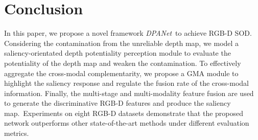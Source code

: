 \documentclass[journal]{IEEEtran}
\def\OURNET{\textit{DPANet}}
\begin{document}
\section{Conclusion}
In this paper, we propose a novel framework \OURNET\ to achieve RGB-D SOD. Considering the contamination from the unreliable depth map, we model a saliency-orientated depth potentiality perception module to evaluate the potentiality of the depth map and weaken the contamination. To effectively aggregate the cross-modal complementarity, we propose a GMA module to highlight the saliency response and regulate the fusion rate of the cross-modal information. Finally, the multi-stage and multi-modality feature fusion are used to generate the discriminative RGB-D features and produce the saliency map.\ Experiments on eight RGB-D datasets demonstrate that the proposed network outperforms other  state-of-the-art methods under different evaluation metrics.


\par
\ifCLASSOPTIONcaptionsoff
  \newpage
\fi
{


}
\end{document}
